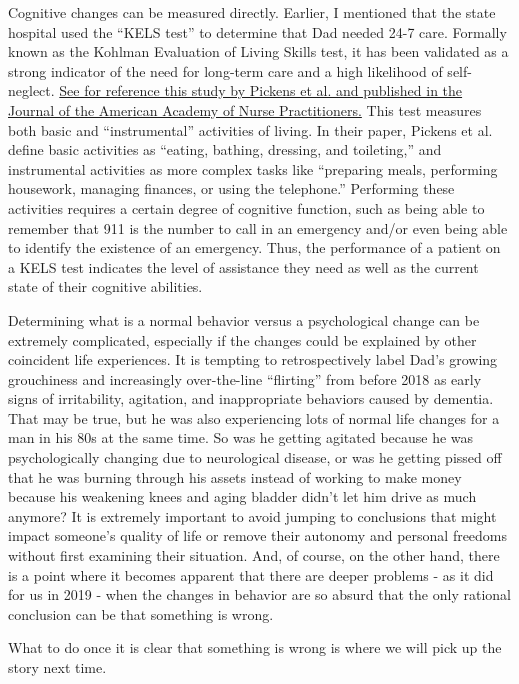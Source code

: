 \documentclass{article}
\begin{document}
Cognitive changes can be measured directly. Earlier, I mentioned that the state hospital used the ``KELS test'' to determine that Dad needed 24-7 care. Formally known as the Kohlman Evaluation of Living Skills test, it has been validated as a strong indicator of the need for long-term care and a high likelihood of self-neglect. \href{https://www.ncbi.nlm.nih.gov/pmc/articles/PMC2855540/}{See for reference this study by Pickens et al. and published in the Journal of the American Academy of Nurse Practitioners.} This test measures both basic and ``instrumental'' activities of living. In their paper, Pickens et al. define basic activities as ``eating, bathing, dressing, and toileting,'' and instrumental activities as more complex tasks like ``preparing meals, performing housework, managing finances, or using the telephone.'' Performing these activities requires a certain degree of cognitive function, such as being able to remember that 911 is the number to call in an emergency and/or even being able to identify the existence of an emergency. Thus, the performance of a patient on a KELS test indicates the level of assistance they need as well as the current state of their cognitive abilities. 

Determining what is a normal behavior versus a psychological change can be extremely complicated, especially if the changes could be explained by other coincident life experiences. It is tempting to retrospectively label Dad's growing grouchiness and increasingly over-the-line ``flirting'' from before 2018 as early signs of irritability, agitation, and inappropriate behaviors caused by dementia. That may be true, but he was also experiencing lots of normal life changes for a man in his 80s at the same time. So was he getting agitated because he was psychologically changing due to neurological disease, or was he getting pissed off that he was burning through his assets instead of working to make money because his weakening knees and aging bladder didn't let him drive as much anymore? It is extremely important to avoid jumping to conclusions that might impact someone's quality of life or remove their autonomy and personal freedoms without first examining their situation. And, of course, on the other hand, there is a point where it becomes apparent that there are deeper problems - as it did for us in 2019 - when the changes in behavior are so absurd that the only rational conclusion can be that something is wrong.

What to do once it is clear that something is wrong is where we will pick up the story next time.
\end{document}
